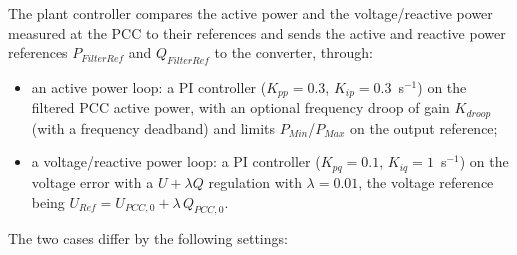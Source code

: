 \documentclass[a4paper, 12pt]{report}
\begin{document}
The plant controller compares the active power and the voltage/reactive power measured at the PCC to their references and sends the active and reactive power references $P_{FilterRef}$ and $Q_{FilterRef}$ to the converter, through:
\begin{itemize}
\item an active power loop: a PI controller ($K_{pp} = 0.3$, $K_{ip} = 0.3$~s$^{-1}$) on the filtered PCC active power, with an optional frequency droop of gain $K_{droop}$ (with a frequency deadband) and limits $P_{Min}$/$P_{Max}$ on the output reference;
\item a voltage/reactive power loop: a PI controller ($K_{pq} = 0.1$, $K_{iq} = 1$~s$^{-1}$) on the voltage error with a $U + \lambda Q$ regulation with $\lambda = 0.01$, the voltage reference being $U_{Ref} = U_{PCC,0} + \lambda \, Q_{PCC,0}$.
\end{itemize}

The two cases differ by the following settings:
\begin{table}[H]
\centering
{}
\caption{Main differences between the two plant control test cases.}
\label{tab:plant_control_settings}
\end{table}
\end{document}
